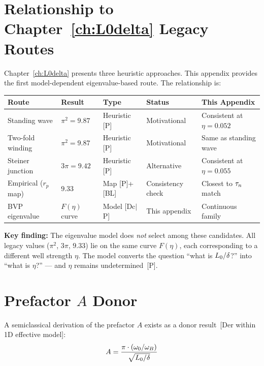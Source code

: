 \section{Relationship to Chapter~\ref{ch:L0delta} Legacy Routes}
\label{sec:L0d:legacy}

Chapter~\ref{ch:L0delta} presents three heuristic approaches. This appendix
provides the first model-dependent eigenvalue-based route. The relationship is:

\begin{center}
\begin{tabular}{lllll}
\toprule
\textbf{Route} & \textbf{Result} & \textbf{Type} & \textbf{Status}
    & \textbf{This Appendix} \\
\midrule
Standing wave    & $\pi^2 = 9.87$ & Heuristic [P] & Motivational
    & Consistent at $\eta = 0.052$ \\
Two-fold winding & $\pi^2 = 9.87$ & Heuristic [P] & Motivational
    & Same as standing wave \\
Steiner junction & $3\pi = 9.42$  & Heuristic [P] & Alternative
    & Consistent at $\eta = 0.055$ \\
Empirical ($r_p$ map) & $9.33$    & Map [P]+[BL]  & Consistency check
    & Closest to $\tau_n$ match \\
\midrule
BVP eigenvalue   & $F(\eta)$ curve & Model [Dc$|$P] & This appendix
    & Continuous family \\
\bottomrule
\end{tabular}
\end{center}

\textbf{Key finding:} The eigenvalue model does \emph{not} select among these
candidates. All legacy values ($\pi^2$, $3\pi$, $9.33$) lie on the same curve
$F(\eta)$, each corresponding to a different well strength $\eta$. The model
converts the question ``what is $L_0/\delta$?'' into ``what is $\eta$?'' ---
and $\eta$ remains undetermined~[P].

\section{Prefactor $A$ Donor}
\label{sec:L0d:prefactor}

A semiclassical derivation of the prefactor $A$ exists as a donor result~[Der
within 1D effective model]:
\begin{equation}
    A = \frac{\pi \cdot (\omega_0/\omega_B)}{\sqrt{L_0/\delta}}
    \label{eq:A_semiclassical}
\end{equation}

